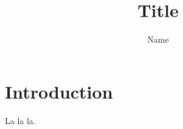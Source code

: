 \documentclass{article}
\title{Title}
\author{Name}
\begin{document}
\maketitle

\section{Introduction}

La la la.


\end{document}
